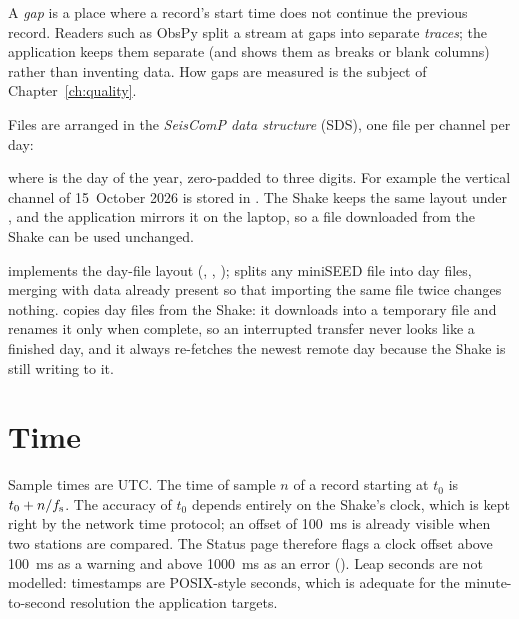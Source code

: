 A \emph{gap} is a place where a record's start time does not continue the previous record. Readers such as ObsPy
split a stream at gaps into separate \emph{traces}; the application keeps them separate (and shows them as breaks
or blank columns) rather than inventing data. How gaps are measured is the subject of Chapter~\ref{ch:quality}.

Files are arranged in the \emph{SeisComP data structure} (SDS), one file per channel per day:
\begin{center}
\end{center}
where  is the day of the year, zero-padded to three digits. For example the vertical channel of
15~October 2026 is stored in . The Shake keeps the same layout
under , and the application mirrors it on the laptop, so a file downloaded from the Shake
can be used unchanged.

\begin{rs3dapp}
 implements the day-file layout (, , ); 
splits any miniSEED file into day files, merging with data already present so that importing the same file twice
changes nothing.  copies day files from the Shake: it downloads into a temporary 
file and renames it only when complete, so an interrupted transfer never looks like a finished day, and it
always re-fetches the newest remote day because the Shake is still writing to it.
\end{rs3dapp}

\section{Time}
Sample times are UTC. The time of sample $n$ of a record starting at $t_0$ is $t_0 + n/f_{\mathrm{s}}$. The accuracy of
$t_0$ depends entirely on the Shake's clock, which is kept right by the network time protocol; an offset of
100~ms is already visible when two stations are compared. The Status page therefore flags a clock offset above
100~ms as a warning and above 1000~ms as an error (). Leap seconds are not modelled:
timestamps are POSIX-style seconds, which is adequate for the minute-to-second resolution the application targets.
